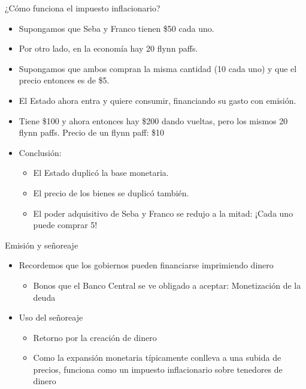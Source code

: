 \documentclass{beamer}
\begin{document}
\begin{frame}{¿Cómo funciona el impuesto inflacionario?}
    \begin{itemize}
        \item Supongamos que Seba y Franco tienen \$50 cada uno. 
        \item Por otro lado, en la economía hay 20 flynn paffs.
        \item Supongamos que ambos compran la misma cantidad (10 cada uno) y que el precio entonces es de \$5.
        \item El Estado ahora entra y quiere consumir, financiando su gasto con emisión.
        \item Tiene \$100 y ahora entonces hay \$200 dando vueltas, pero los mismos 20 flynn paffs. Precio de un flynn paff: \$10
        \item Conclusión:
        \begin{itemize}
            \item El Estado duplicó la base monetaria.
            \item El precio de los bienes se duplicó también.
            \item El poder adquisitivo de Seba y Franco se redujo a la mitad: ¡Cada uno puede comprar 5!
        \end{itemize} 
    \end{itemize}
\end{frame}

\begin{frame}{Emisión y señoreaje}
    \begin{itemize}
        \item Recordemos que los gobiernos pueden financiarse imprimiendo dinero
        \begin{itemize}
            \item Bonos que el Banco Central se ve obligado a aceptar: Monetización de la deuda
        \end{itemize}
        \item Uso del señoreaje
        \begin{itemize}
            \item Retorno por la creación de dinero
            \item Como la expansión monetaria típicamente conlleva a una subida de precios, funciona como un impuesto inflacionario sobre tenedores de dinero 
        \end{itemize}
    \end{itemize}
\end{frame}
\end{document}
